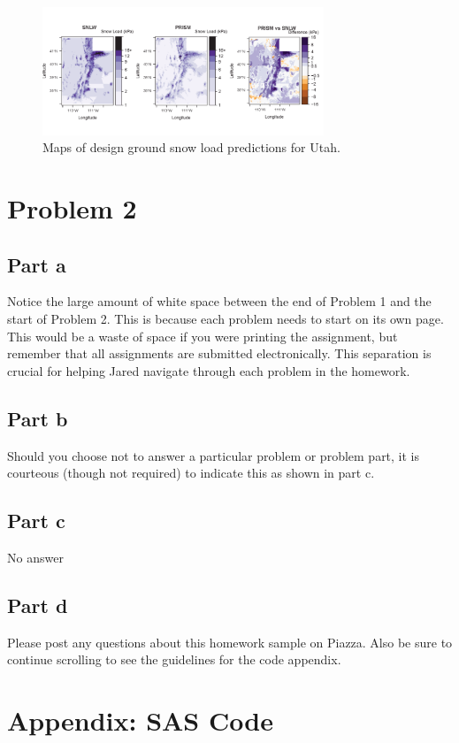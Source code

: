 \documentclass[12pt]{article}
\begin{document}
\begin{figure}[H] 
\center 
\includegraphics[width = 0.75\textwidth]{map1.png} 
\caption{Maps of design ground snow load predictions for Utah.}
\label{mapfig}
\end{figure} 
\newpage

\section*{Problem 2}
\subsection*{Part a}
Notice the large amount of white space between the end of Problem 1 and the start of Problem 2. This is because each problem needs to start on its own page. This would be a waste of space if you were printing the assignment, but remember that all assignments are submitted electronically. This separation is crucial for helping Jared navigate through each problem in the homework. 

\subsection*{Part b}
Should you choose not to answer a particular problem or problem part, it is courteous (though not required) to indicate this as shown in part c. 

\subsection*{Part c}
No answer

\subsection*{Part d}
Please post any questions about this homework sample on Piazza. Also be sure to continue scrolling to see the guidelines for the code appendix. 


\newpage
\section*{Appendix: SAS Code}
\end{document}
